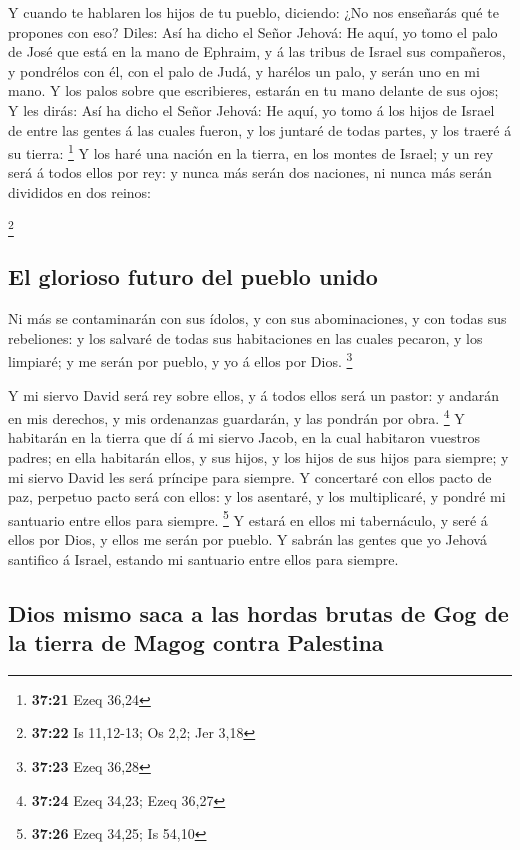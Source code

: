  Y cuando te hablaren los hijos de tu pueblo, diciendo:
¿No nos enseñarás qué te propones con eso?  Diles: Así ha
dicho el Señor Jehová: He aquí, yo tomo el palo de José que está en la
mano de Ephraim, y á las tribus de Israel sus compañeros, y pondrélos
con él, con el palo de Judá, y harélos un palo, y serán uno en mi mano.
 Y los palos sobre que escribieres, estarán en tu mano
delante de sus ojos;  Y les dirás: Así ha dicho el Señor
Jehová: He aquí, yo tomo á los hijos de Israel de entre las gentes á las
cuales fueron, y los juntaré de todas partes, y los traeré á su tierra:
\footnote{\textbf{37:21} Ezeq 36,24}  Y los haré una
nación en la tierra, en los montes de Israel; y un rey será á todos
ellos por rey: y nunca más serán dos naciones, ni nunca más serán
divididos en dos reinos:

\footnote{\textbf{37:22} Is 11,12-13; Os 2,2; Jer 3,18}

\hypertarget{el-glorioso-futuro-del-pueblo-unido}{%
\subsection{El glorioso futuro del pueblo
unido}\label{el-glorioso-futuro-del-pueblo-unido}}

 Ni más se contaminarán con sus ídolos, y con sus
abominaciones, y con todas sus rebeliones: y los salvaré de todas sus
habitaciones en las cuales pecaron, y los limpiaré; y me serán por
pueblo, y yo á ellos por Dios. \footnote{\textbf{37:23} Ezeq 36,28}

 Y mi siervo David será rey sobre ellos, y á todos ellos
será un pastor: y andarán en mis derechos, y mis ordenanzas guardarán, y
las pondrán por obra. \footnote{\textbf{37:24} Ezeq 34,23; Ezeq 36,27}
 Y habitarán en la tierra que dí á mi siervo Jacob, en la
cual habitaron vuestros padres; en ella habitarán ellos, y sus hijos, y
los hijos de sus hijos para siempre; y mi siervo David les será príncipe
para siempre.  Y concertaré con ellos pacto de paz,
perpetuo pacto será con ellos: y los asentaré, y los multiplicaré, y
pondré mi santuario entre ellos para siempre. \footnote{\textbf{37:26}
  Ezeq 34,25; Is 54,10}  Y estará en ellos mi
tabernáculo, y seré á ellos por Dios, y ellos me serán por pueblo.
 Y sabrán las gentes que yo Jehová santifico á Israel,
estando mi santuario entre ellos para siempre.

\hypertarget{dios-mismo-saca-a-las-hordas-brutas-de-gog-de-la-tierra-de-magog-contra-palestina}{%
\subsection{Dios mismo saca a las hordas brutas de Gog de la tierra de
Magog contra
Palestina}\label{dios-mismo-saca-a-las-hordas-brutas-de-gog-de-la-tierra-de-magog-contra-palestina}}

